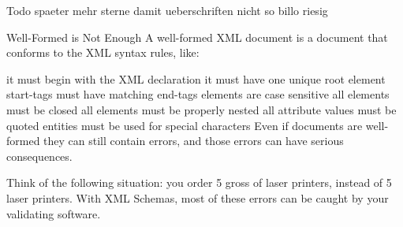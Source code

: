 \documentclass[11pt]{article}
\author{eo shiru}
\date{\today}
\title{}
\begin{document}
\tableofcontents

Todo spaeter mehr sterne damit ueberschriften nicht so billo riesig

Well-Formed is Not Enough
A well-formed XML document is a document that conforms to the XML syntax rules, like:

it must begin with the XML declaration
it must have one unique root element
start-tags must have matching end-tags
elements are case sensitive
all elements must be closed
all elements must be properly nested
all attribute values must be quoted
entities must be used for special characters
Even if documents are well-formed they can still contain errors, and those errors can have serious consequences.

Think of the following situation: you order 5 gross of laser printers, instead of 5 laser printers. With XML Schemas, most of these errors can be caught by your validating software.
\end{document}
